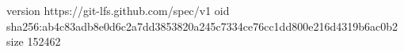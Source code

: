 version https://git-lfs.github.com/spec/v1
oid sha256:ab4c83adb8e0d6c2a7dd3853820a245c7334ce76cc1dd800e216d4319b6ac0b2
size 152462
